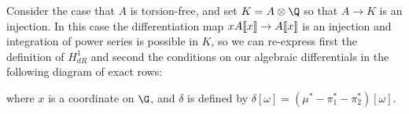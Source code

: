 \begin{example}
Consider the case that \(A\) is torsion-free, and set \(K = A \otimes \Q\) so that \(A \to K\) is an injection.  In this case the differentiation map \(x A\llbracket{x}\rrbracket \to A\llbracket{x}\rrbracket\) is an injection and integration of power series is possible in \(K\), so we can re-express first the definition of \(H^1_{dR}\) and second the conditions on our algebraic differentials in the following diagram of exact rows:
\begin{center}
\end{center}
where \(x\) is a coordinate on \(\G\), and \(\delta\) is defined by \(\delta [\omega] = (\mu^* - \pi_1^* - \pi_2^*)[\omega]\).
\end{example}


